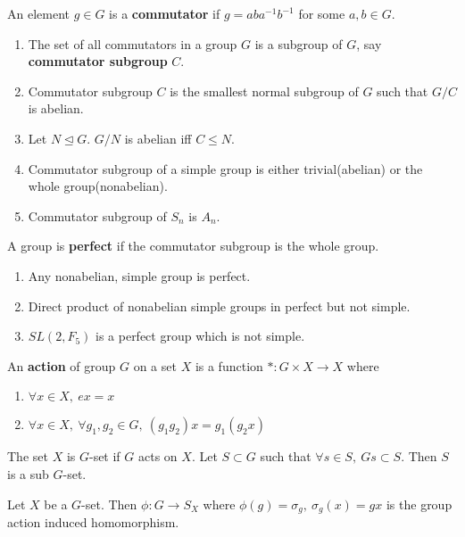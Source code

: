 \begin{definition}
	An element $g \in G$ is a \textbf{commutator} if $g=aba^{-1}b^{-1}$ for some $a,b \in G$.
\end{definition}
\begin{enumerate}
	\item The set of all commutators in a group $G$ is a subgroup of $G$, say \textbf{commutator subgroup} $C$.
	\item Commutator subgroup $C$ is the smallest normal subgroup of $G$ such that $G/C$ is abelian.
	\item Let $N \trianglelefteq G$. $G/N$ is abelian iff $C \le N$.
	\item Commutator subgroup of a simple group is either trivial(abelian) or the whole group(nonabelian).
	\item Commutator subgroup of $S_n$ is $A_n$.
\end{enumerate}
\begin{definition}
	A group is \textbf{perfect} if the commutator subgroup is the whole group.
\end{definition}
\begin{enumerate}
	\item Any nonabelian, simple group is perfect. 
	\item Direct product of nonabelian simple groups in perfect but not simple.
	\item $SL(2,F_5)$ is a perfect group which is not simple.
\end{enumerate}

\begin{definition}
	An \textbf{action} of group $G$ on a set $X$ is a function $\ast : G \times X \to X$ where
	\begin{enumerate}
		\item $\forall x \in X,\ ex = x$
		\item $\forall x \in X,\ \forall g_1,g_2 \in G,\ (g_1g_2)x = g_1(g_2x)$
	\end{enumerate}
\end{definition}
	The set $X$ is $G$-set if $G$ acts on $X$.
	Let $S \subset G$ such that $\forall s \in S,\ Gs \subset S$. Then $S$ is a sub $G$-set.

\begin{theorem}
	Let $X$ be a $G$-set.
	Then $\phi : G \to S_X$ where $\phi(g) = \sigma_g,\ \sigma_g(x) = gx$ is the group action induced homomorphism.
\end{theorem}


